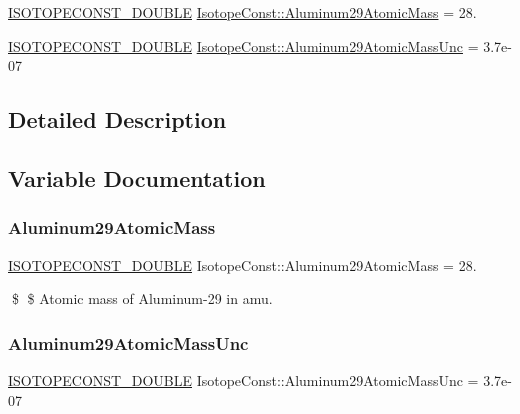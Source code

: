 \begin{DoxyCompactItemize}
\item 
\mbox{\hyperlink{group___isotope_const-_macros_ga8f45a7272ce02c0b4c65c44636ed719a}{I\+S\+O\+T\+O\+P\+E\+C\+O\+N\+S\+T\+\_\+\+D\+O\+U\+B\+LE}} \mbox{\hyperlink{group___isotope_const-_aluminum-_al29_gae8adc38b1ef93d1dc519bc0c5338b7f4}{Isotope\+Const\+::\+Aluminum29\+Atomic\+Mass}} = 28.
\item 
\mbox{\hyperlink{group___isotope_const-_macros_ga8f45a7272ce02c0b4c65c44636ed719a}{I\+S\+O\+T\+O\+P\+E\+C\+O\+N\+S\+T\+\_\+\+D\+O\+U\+B\+LE}} \mbox{\hyperlink{group___isotope_const-_aluminum-_al29_ga7c91bbefc83918ce81c2d01f38f8befb}{Isotope\+Const\+::\+Aluminum29\+Atomic\+Mass\+Unc}} = 3.\+7e-\/07
\end{DoxyCompactItemize}


\subsection{Detailed Description}


\subsection{Variable Documentation}
\mbox{\label{group___isotope_const-_aluminum-_al29_gae8adc38b1ef93d1dc519bc0c5338b7f4}} 
\subsubsection{\texorpdfstring{Aluminum29\+Atomic\+Mass}{Aluminum29AtomicMass}}
{\footnotesize\ttfamily \mbox{\hyperlink{group___isotope_const-_macros_ga8f45a7272ce02c0b4c65c44636ed719a}{I\+S\+O\+T\+O\+P\+E\+C\+O\+N\+S\+T\+\_\+\+D\+O\+U\+B\+LE}} Isotope\+Const\+::\+Aluminum29\+Atomic\+Mass = 28.}

\$ \$ Atomic mass of Aluminum-\/29 in amu. \mbox{\label{group___isotope_const-_aluminum-_al29_ga7c91bbefc83918ce81c2d01f38f8befb}} 
\subsubsection{\texorpdfstring{Aluminum29\+Atomic\+Mass\+Unc}{Aluminum29AtomicMassUnc}}
{\footnotesize\ttfamily \mbox{\hyperlink{group___isotope_const-_macros_ga8f45a7272ce02c0b4c65c44636ed719a}{I\+S\+O\+T\+O\+P\+E\+C\+O\+N\+S\+T\+\_\+\+D\+O\+U\+B\+LE}} Isotope\+Const\+::\+Aluminum29\+Atomic\+Mass\+Unc = 3.\+7e-\/07}

